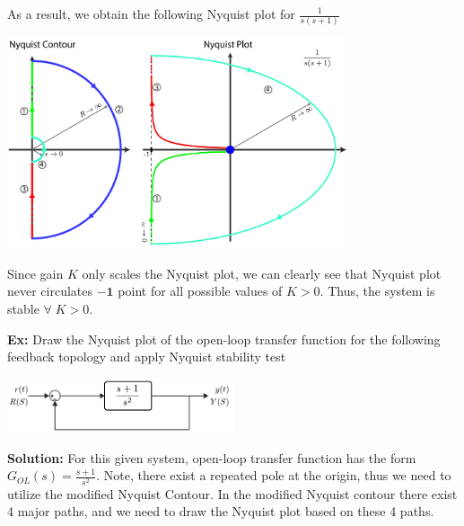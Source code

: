 \documentclass{article}
\begin{document}
As a result, we obtain the following Nyquist plot for
$ \frac{1}{s (s+1)}$

\vspace{6 pt}

  \begin{minipage}[h]{1\linewidth}
    \begin{center}
      \includegraphics[width=0.75\textwidth]{figs/ex5}
    \end{center}
  \end{minipage}

\vspace{6 pt}

Since gain $K$ only scales the Nyquist plot, we can clearly see that 
Nyquist plot never circulates $\mathbf{-1}$ point for all possible values of $K > 0$.
Thus, the system is stable $\forall \; K > 0$.

\vspace{12 pt}

\textbf{Ex:} Draw the Nyquist plot of the open-loop transfer function 
for the following feedback topology and apply Nyquist stability test 

\vspace{12 pt}

  \begin{minipage}[h]{1\linewidth}
    \begin{center}
      \includegraphics[width=0.5\textwidth]{figs/block_doubleint}
    \end{center}
  \end{minipage}

\vspace{12 pt}

\textbf{Solution:} For this given system, open-loop
transfer function has the form $ G_{OL}(s) = \frac{s+1}{s^2}$. Note, there exist a repeated pole at the origin, thus 
we need to utilize the modified Nyquist Contour. 
In the modified Nyquist contour there exist 4 major paths, 
and we need to draw the Nyquist plot based on these 4 paths. 
\end{document}
